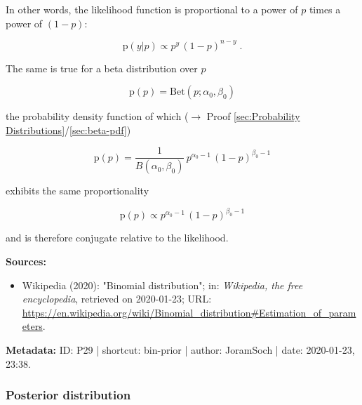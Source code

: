 \documentclass[a4paper,12pt,twoside]{book}
\begin{document}
In other words, the likelihood function is proportional to a power of $p$ times a power of $(1-p)$:

\begin{equation} \label{eq:bin-prior-Bin-LF-prop}
\mathrm{p}(y|p) \propto p^y \, (1-p)^{n-y} \; .
\end{equation}

The same is true for a beta distribution over $p$

\begin{equation} \label{eq:bin-prior-Bin-prior-s1}
\mathrm{p}(p) = \mathrm{Bet}(p; \alpha_0, \beta_0)
\end{equation}

the probability density function of which ($\rightarrow$ Proof \ref{sec:Probability Distributions}/\ref{sec:beta-pdf})

\begin{equation} \label{eq:bin-prior-Bin-prior-s2}
\mathrm{p}(p) = \frac{1}{B(\alpha_0,\beta_0)} \, p^{\alpha_0-1} \, (1-p)^{\beta_0-1}
\end{equation}

exhibits the same proportionality

\begin{equation} \label{eq:bin-prior-Bin-prior-s3}
\mathrm{p}(p) \propto p^{\alpha_0-1} \, (1-p)^{\beta_0-1}
\end{equation}

and is therefore conjugate relative to the likelihood.


\vspace{1em}
\textbf{Sources:}
\begin{itemize}
\item Wikipedia (2020): "Binomial distribution"; in: \textit{Wikipedia, the free encyclopedia}, retrieved on 2020-01-23; URL: \url{https://en.wikipedia.org/wiki/Binomial_distribution#Estimation_of_parameters}.
\end{itemize}


\vspace{1em}
\textbf{Metadata:} ID: P29 | shortcut: bin-prior | author: JoramSoch | date: 2020-01-23, 23:38.
\vspace{1em}



\subsubsection[\textbf{Posterior distribution}]{Posterior distribution} \label{sec:bin-post}
\setcounter{equation}{0}
\end{document}

